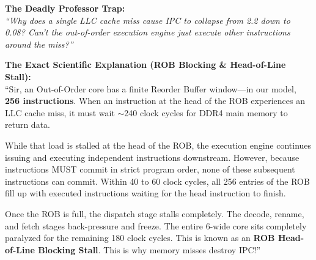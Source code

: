 \documentclass[11pt, a4paper]{article}
\begin{document}
\begin{trapbox}
\textbf{The Deadly Professor Trap:}\\
\textit{``Why does a single LLC cache miss cause IPC to collapse from 2.2 down to 0.08? Can't the out-of-order execution engine just execute other instructions around the miss?''}
\end{trapbox}

\begin{answerbox}
\textbf{The Exact Scientific Explanation (ROB Blocking \& Head-of-Line Stall):}\\
``Sir, an Out-of-Order core has a finite Reorder Buffer window---in our model, \textbf{256 instructions}. When an instruction at the head of the ROB experiences an LLC cache miss, it must wait $\sim$240 clock cycles for DDR4 main memory to return data. 

While that load is stalled at the head of the ROB, the execution engine continues issuing and executing independent instructions downstream. However, because instructions MUST commit in strict program order, none of these subsequent instructions can commit. Within 40 to 60 clock cycles, all 256 entries of the ROB fill up with executed instructions waiting for the head instruction to finish. 

Once the ROB is full, the dispatch stage stalls completely. The decode, rename, and fetch stages back-pressure and freeze. The entire 6-wide core sits completely paralyzed for the remaining 180 clock cycles. This is known as an \textbf{ROB Head-of-Line Blocking Stall}. This is why memory misses destroy IPC!''
\end{answerbox}
\end{document}
